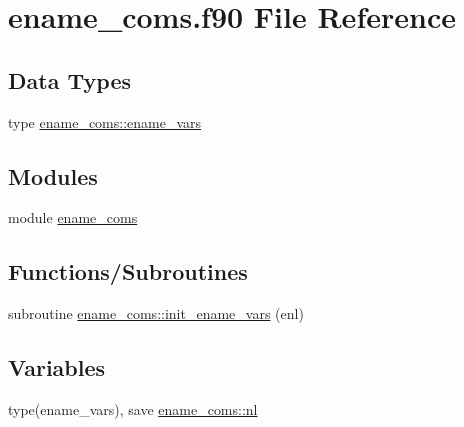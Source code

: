 \hypertarget{ename__coms_8f90}{}\section{ename\+\_\+coms.\+f90 File Reference}
\label{ename__coms_8f90}
\subsection*{Data Types}
\begin{DoxyCompactItemize}
\item 
type \hyperlink{structename__coms_1_1ename__vars}{ename\+\_\+coms\+::ename\+\_\+vars}
\end{DoxyCompactItemize}
\subsection*{Modules}
\begin{DoxyCompactItemize}
\item 
module \hyperlink{namespaceename__coms}{ename\+\_\+coms}
\end{DoxyCompactItemize}
\subsection*{Functions/\+Subroutines}
\begin{DoxyCompactItemize}
\item 
subroutine \hyperlink{namespaceename__coms_af7ad337997a039b5535379ab67b5f371}{ename\+\_\+coms\+::init\+\_\+ename\+\_\+vars} (enl)
\end{DoxyCompactItemize}
\subsection*{Variables}
\begin{DoxyCompactItemize}
\item 
type(ename\+\_\+vars), save \hyperlink{namespaceename__coms_a87d8817dfc69ff263d0afc7954d7dbc0}{ename\+\_\+coms\+::nl}
\end{DoxyCompactItemize}
